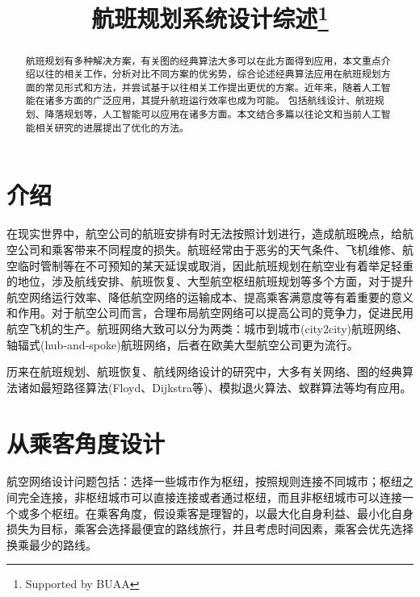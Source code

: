 \documentclass[runningheads]{llncs}
\begin{document}
\title{航班规划系统设计综述\thanks{Supported by BUAA}}
\maketitle
\begin{abstract}
航班规划有多种解决方案，有关图的经典算法大多可以在此方面得到应用，本文重点介绍以往的相关工作，分析对比不同方案的优劣势，综合论述经典算法应用在航班规划方面的常见形式和方法，并尝试基于以往相关工作提出更优的方案。近年来，随着人工智能在诸多方面的广泛应用，其提升航班运行效率也成为可能。 包括航线设计、航班规划、降落规划等，人工智能可以应用在诸多方面。本文结合多篇以往论文和当前人工智能相关研究的进展提出了优化的方法。
\end{abstract}

\section{介绍}
在现实世界中，航空公司的航班安排有时无法按照计划进行，造成航班晚点，给航空公司和乘客带来不同程度的损失。航班经常由于恶劣的天气条件、飞机维修、航空临时管制等在不可预知的某天延误或取消，因此航班规划在航空业有着举足轻重的地位，涉及航线安排、航班恢复、大型航空枢纽航班规划等多个方面，对于提升航空网络运行效率、降低航空网络的运输成本、提高乘客满意度等有着重要的意义和作用。对于航空公司而言，合理布局航空网络可以提高公司的竞争力，促进民用航空飞机的生产。航班网络大致可以分为两类：城市到城市(city2city)航班网络、轴辐式(hub-and-spoke)航班网络，后者在欧美大型航空公司更为流行。

历来在航班规划、航班恢复、航线网络设计的研究中，大多有关网络、图的经典算法诸如最短路径算法(Floyd、Dijkstra等)、模拟退火算法、蚁群算法等均有应用。

\section{从乘客角度设计}
航空网络设计问题包括：选择一些城市作为枢纽，按照规则连接不同城市；枢纽之间完全连接，非枢纽城市可以直接连接或者通过枢纽，而且非枢纽城市可以连接一个或多个枢纽。在乘客角度，假设乘客是理智的，以最大化自身利益、最小化自身损失为目标，乘客会选择最便宜的路线旅行，并且考虑时间因素，乘客会优先选择换乘最少的路线。
\end{document}
